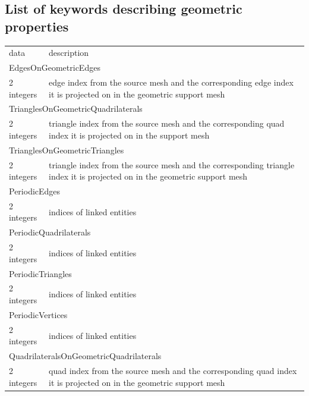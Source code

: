 \documentclass[a4paper,12pt]{article}
\begin{document}
\subsection{List of keywords describing geometric properties}

\setlongtables
\begin{longtable}{|m{4cm}|m{11cm}|}
\endhead
\endfoot

\hline
\multicolumn{2}{|l|}{keyword} \\
\hline
data & description \\
\hline\hline

\multicolumn{2}{|l|}{EdgesOnGeometricEdges} \\
\hline
2 integers & edge index from the source mesh and the corresponding edge index it is projected on in the geometric support mesh \\
\hline\hline

\multicolumn{2}{|l|}{TrianglesOnGeometricQuadrilaterals} \\
\hline
2 integers & triangle index from the source mesh and the corresponding quad index it is projected on in the support mesh \\
\hline\hline

\multicolumn{2}{|l|}{TrianglesOnGeometricTriangles} \\
\hline
2 integers & triangle index from the source mesh and the corresponding triangle index it is projected on in the geometric support mesh \\
\hline\hline

\multicolumn{2}{|l|}{PeriodicEdges} \\
\hline
2 integers & indices of linked entities \\
\hline\hline

\multicolumn{2}{|l|}{PeriodicQuadrilaterals} \\
\hline
2 integers & indices of linked entities \\
\hline\hline

\multicolumn{2}{|l|}{PeriodicTriangles} \\
\hline
2 integers & indices of linked entities \\
\hline\hline

\multicolumn{2}{|l|}{PeriodicVertices} \\
\hline
2 integers & indices of linked entities \\
\hline\hline

\multicolumn{2}{|l|}{QuadrilateralsOnGeometricQuadrilaterals} \\
\hline
2 integers & quad index from the source mesh and the corresponding quad index it is projected on in the geometric support mesh \\
\hline\hline


\end{longtable}
\end{document}
